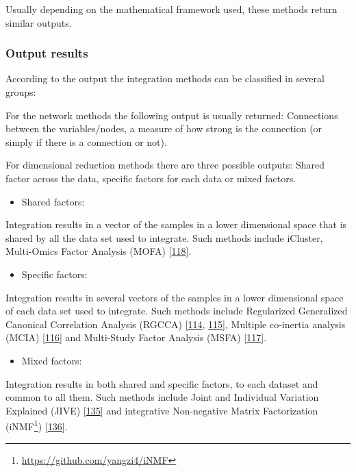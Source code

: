 \documentclass[
  a4paper,
]{book}
\DeclareRobustCommand{\href}[2]{#2\footnote{\url{#1}}}
\providecommand{\tightlist}{%
  \setlength{\itemsep}{0pt}\setlength{\parskip}{0pt}}
\begin{document}
Usually depending on the mathematical framework used, these methods return similar outputs.

\hypertarget{output-results}{%
\subsubsection{Output results}\label{output-results}}

According to the output the integration methods can be classified in several groups:

For the network methods the following output is usually returned: Connections between the variables/nodes, a measure of how strong is the connection (or simply if there is a connection or not).

For dimensional reduction methods there are three possible outputs: Shared factor across the data, specific factors for each data or mixed factors.

\begin{itemize}
\tightlist
\item
  Shared factors:
\end{itemize}

Integration results in a vector of the samples in a lower dimensional space that is shared by all the data set used to integrate.
Such methods include iCluster, Multi-Omics Factor Analysis (MOFA) {[}\protect\hyperlink{ref-argelaguet_multi-omics_2018}{118}{]}.

\begin{itemize}
\tightlist
\item
  Specific factors:
\end{itemize}

Integration results in several vectors of the samples in a lower dimensional space of each data set used to integrate.
Such methods include Regularized Generalized Canonical Correlation Analysis (RGCCA) {[}\protect\hyperlink{ref-tenenhaus_regularized_2011}{114}, \protect\hyperlink{ref-tenenhaus_variable_2014}{115}{]}, Multiple co-inertia analysis (MCIA) {[}\protect\hyperlink{ref-culhane_cross-platform_2003}{116}{]} and Multi-Study Factor Analysis (MSFA) {[}\protect\hyperlink{ref-vito_multi-study_2019}{117}{]}.

\begin{itemize}
\tightlist
\item
  Mixed factors:
\end{itemize}

Integration results in both shared and specific factors, to each dataset and common to all them.
Such methods include Joint and Individual Variation Explained (JIVE) {[}\protect\hyperlink{ref-lock2013a}{135}{]} and integrative Non-negative Matrix Factorization (\href{https://github.com/yangzi4/iNMF}{iNMF}) {[}\protect\hyperlink{ref-yang2016}{136}{]}.
\end{document}

